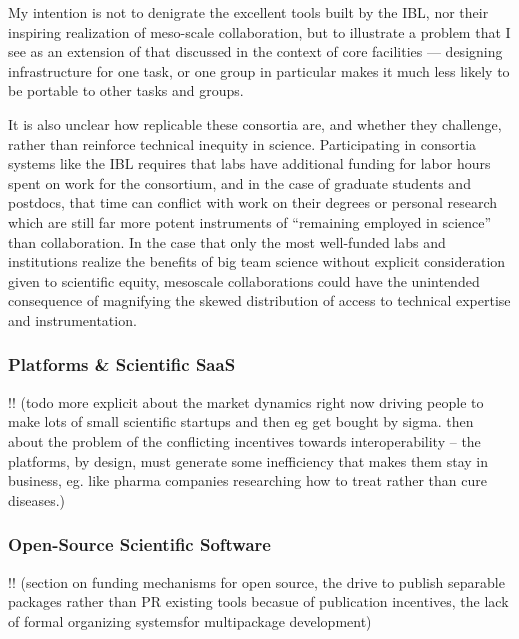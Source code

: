 \documentclass{article}
\begin{document}
My intention is not to denigrate the excellent tools built by the IBL,
nor their inspiring realization of meso-scale collaboration, but to
illustrate a problem that I see as an extension of that discussed in the
context of core facilities --- designing infrastructure for one task, or
one group in particular makes it much less likely to be portable to
other tasks and groups.

It is also unclear how replicable these consortia are, and whether they
challenge, rather than reinforce technical inequity in science.
Participating in consortia systems like the IBL requires that labs have
additional funding for labor hours spent on work for the consortium, and
in the case of graduate students and postdocs, that time can conflict
with work on their degrees or personal research which are still far more
potent instruments of ``remaining employed in science'' than
collaboration. In the case that only the most well-funded labs and
institutions realize the benefits of big team science without explicit
consideration given to scientific equity, mesoscale collaborations could
have the unintended consequence of magnifying the skewed distribution of
access to technical expertise and instrumentation.

\hypertarget{platforms-scientific-saas}{%
\subsubsection{Platforms \& Scientific
SaaS}\label{platforms-scientific-saas}}

!! (todo more explicit about the market dynamics right now driving
people to make lots of small scientific startups and then eg get bought
by sigma. then about the problem of the conflicting incentives towards
interoperability -- the platforms, by design, must generate some
inefficiency that makes them stay in business, eg. like pharma companies
researching how to treat rather than cure diseases.)

\hypertarget{open-source-scientific-software}{%
\subsubsection{Open-Source Scientific
Software}\label{open-source-scientific-software}}

!! (section on funding mechanisms for open source, the drive to publish
separable packages rather than PR existing tools becasue of publication
incentives, the lack of formal organizing systemsfor multipackage
development)
\end{document}
